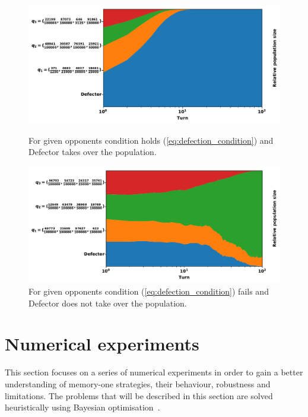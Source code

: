 \documentclass[10pt]{article}
\begin{document}
\begin{figure}[!htb]
    \centering
    \begin{minipage}{.48\textwidth}
        \centering
        \includegraphics[width=\linewidth]{img/population_defection_takes_over.pdf}
        \caption{For given opponents
        condition holds (\ref{eq:defection_condition}) and Defector takes over the population.}
        \label{fig:stable_defection}
    \end{minipage}\hfill
    \begin{minipage}{0.48\textwidth}
        \centering
        \includegraphics[width=\linewidth]{img/population_defection_fails.pdf}
        \caption{For given opponents condition (\ref{eq:defection_condition}) fails and Defector does not take over the population.}
        \label{fig:unstable_defection}
    \end{minipage}
\end{figure}
\section{Numerical experiments} \label{section:numerical_experiments}

This section focuses on a series of numerical experiments in order to gain a
better understanding of memory-one strategies, their behaviour, robustness and
limitations. The problems that will be described in this section are solved
heuristically using Bayesian optimisation~\cite{Mokus1978}.
\end{document}
